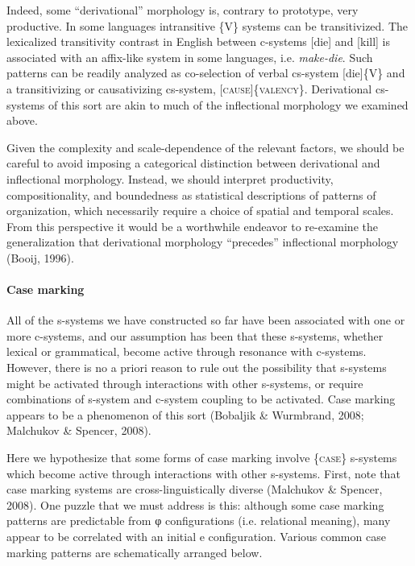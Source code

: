   Indeed, some “derivational” morphology is, contrary to prototype, very productive. In some languages intransitive \{V\} systems can be transitivized. The lexicalized transitivity contrast in English between c-systems [die] and [kill] is associated with an affix-like system in some languages, i.e. \textit{make-die}. Such patterns can be readily analyzed as co-selection of verbal cs-system [die]\{V\} and a transitivizing or causativizing cs-system, [\textsc{cause}]\{\textsc{valency}\}. Derivational cs-systems of this sort are akin to much of the inflectional morphology we examined above. 

  Given the complexity and scale-dependence of the relevant factors, we should be careful to avoid imposing a categorical distinction between derivational and inflectional morphology. Instead, we should interpret productivity, compositionality, and boundedness as statistical descriptions of patterns of organization, which necessarily require a choice of spatial and temporal scales. From this perspective it would be a worthwhile endeavor to re-examine the generalization that derivational morphology “precedes” inflectional morphology (Booij, 1996).

\paragraph{Case marking}

All of the s-systems we have constructed so far have been associated with one or more c-systems, and our assumption has been that these s-systems, whether lexical or grammatical, become active through resonance with c-systems. However, there is no a priori reason to rule out the possibility that s-systems might be activated through interactions with other s-systems, or require combinations of s-system and c-system coupling to be activated. Case marking appears to be a phenomenon of this sort (Bobaljik \& Wurmbrand, 2008; Malchukov \& Spencer, 2008).

  Here we hypothesize that some forms of case marking involve \{\textsc{case}\} s-systems which become active through interactions with other s-systems. First, note that case marking systems are cross-linguistically diverse (Malchukov \& Spencer, 2008). One puzzle that we must address is this: although some case marking patterns are predictable from φ configurations (i.e. relational meaning), many appear to be correlated with an initial e configuration. Various common case marking patterns are schematically arranged below. 

